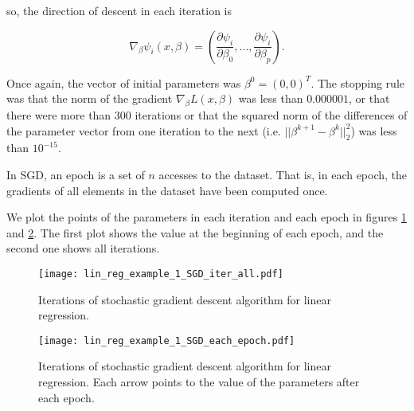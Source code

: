 so, the direction of descent in each iteration is

\[
\nabla_{\beta} \psi_i(x, \beta) = 
\left( \frac{\partial \psi_i}{\partial \beta_0}, ..., \frac{\partial \psi_i}{\partial \beta_p} \right).
\]

Once again, the vector of initial parameters was $\beta^0 = (0, 0)^T$.  The stopping rule was that the norm of the gradient $\nabla_{\beta} L(x, \beta)$ was less than $0.000001$, or that there were more than 300 iterations or that the squared norm of the differences of the parameter vector from one iteration to the next (i.e. $||\beta^{k+1} - \beta^k||^2_2$) was less than $10^{-15}$. 

In SGD, an epoch is a set of $n$ accesses to the dataset. That is, in each epoch, the gradients of all elements in the dataset have been computed once.

We plot the points of the parameters in each iteration and each epoch in figures \ref{fig:lin_reg_example_1_SGD_iter_all} and \ref{fig:lin_reg_example_1_SGD_each_epoch}. The first plot shows the value at the beginning of each epoch, and the second one shows all iterations.



\begin{figure}[H]
  \centering
  \texttt{[image: lin\_reg\_example\_1\_SGD\_iter\_all.pdf]}
  \caption{Iterations of stochastic gradient descent algorithm for linear regression.}
  \label{fig:lin_reg_example_1_SGD_iter_all}
\end{figure}

\begin{figure}[H]
  \centering
  \texttt{[image: lin\_reg\_example\_1\_SGD\_each\_epoch.pdf]}
  \caption{Iterations of stochastic gradient descent algorithm for linear regression. Each arrow points to the value of the parameters after each epoch.}
  \label{fig:lin_reg_example_1_SGD_each_epoch}
\end{figure}


